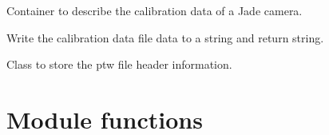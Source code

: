 \documentclass[a4paper,10pt,english]{sphinxmanual}
\begin{document}
\begin{fulllineitems}
\label{ryptw:pyradi.ryptw.JadeCalibrationData}
Container to describe the calibration data of a Jade camera.

\begin{fulllineitems}
\label{ryptw:pyradi.ryptw.JadeCalibrationData.Info}
Write the calibration data file data to a string and return string.

\end{fulllineitems}


\end{fulllineitems}


\begin{fulllineitems}
\label{ryptw:pyradi.ryptw.PTWFrameInfo}
Class to store the ptw file header information.

\end{fulllineitems}



\section{Module functions}
\label{ryptw:module-functions}
\end{document}
